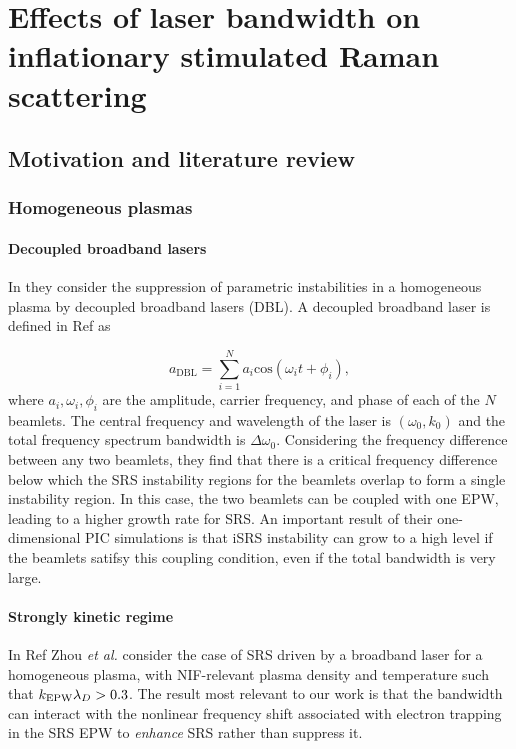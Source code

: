 \chapter{Effects of laser bandwidth on inflationary stimulated Raman scattering}
\label{chp:broadbandSRS}

\section{Motivation and literature review}

\subsection{Homogeneous plasmas}
\subsubsection{Decoupled broadband lasers}
In \cite{zhao_suppression_2019} they consider the suppression of parametric
instabilities in a homogeneous plasma by decoupled broadband lasers
(\acrshort{DBL}). A
decoupled broadband laser is defined in Ref \cite{zhao_effective_2017} as

\begin{equation}\label{eqn:DBL}
  a_{\mathrm{DBL}} = \sum_{i=1}^{N} a_i \mathrm{cos}(\omega_it + \phi_i),
\end{equation}
where $a_i,\omega_i,\phi_i$ are the amplitude, carrier frequency, and phase of
each of the $N$ beamlets. The central frequency and wavelength of the laser is
$(\omega_0,k_0)$ and the total frequency spectrum bandwidth is
$\Delta\omega_0$.
Considering the frequency difference between any two beamlets, they find that
there is a critical frequency difference below which the SRS instability regions
for the beamlets overlap to form a single instability region. In this case, the
two beamlets can be coupled with one EPW, leading to a higher growth rate for
SRS. An important result of their one-dimensional PIC simulations is that iSRS
instability can grow to a high level if the beamlets satifsy this coupling
condition, even if the total bandwidth is very large.

\subsubsection{Strongly kinetic regime}
In Ref \cite{zhou_kinetic_2018} Zhou \textit{et al.} consider the case of SRS
driven by a broadband laser for a homogeneous plasma, with NIF-relevant plasma
density and temperature such that $k_\mathrm{EPW}\lambda_D > 0.3$. The result most relevant to our
work is that the bandwidth can interact with the nonlinear frequency shift associated
with electron trapping in the SRS EPW to \emph{enhance} SRS rather than suppress it.


